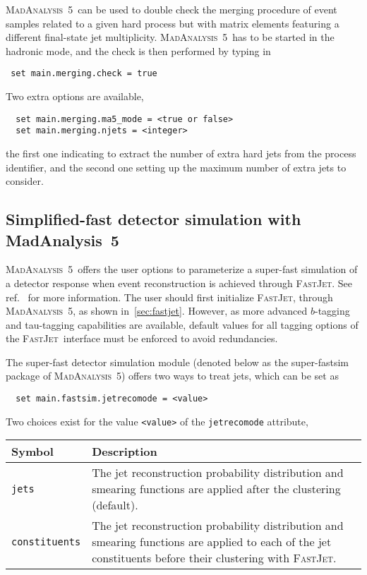\documentclass[a4paper]{article}
\newcommand{\MA}{\textsc{MadAnalysis}~5}
\newcommand{\MAnorm}{{MadAnalysis}~5}
\newcommand{\FJ}{\textsc{FastJet}}
\begin{document}
\noindent \MA\ can be used to double check the merging procedure of event samples related
to a given hard process but with matrix elements featuring a different
final-state jet multiplicity. \MA\ has to be started in the hadronic mode, and
the check is then performed by typing in
{\color{ao}\begin{verbatim}
 set main.merging.check = true
\end{verbatim}}
\noindent Two extra options are available,
{\color{ao}\begin{verbatim}
  set main.merging.ma5_mode = <true or false>
  set main.merging.njets = <integer>
\end{verbatim}}
\noindent the first one indicating to extract the number of extra hard jets from the
process identifier, and the second one setting up the maximum number of extra
jets to consider.

\vspace{.8cm}
\begin{shaded}
	\section{\Large Simplified-fast detector simulation with \MAnorm}
\end{shaded}
\MA\ offers the user options to parameterize a super-fast simulation of a
detector response when event reconstruction is achieved through \FJ. See ref.~\cite{Araz:2020lnp} for more information. The user
should first initialize \FJ, through \MA, as shown in~\autoref{sec:fastjet}.
However, as more advanced $b$-tagging and tau-tagging capabilities are
available, default values for all tagging options of the \FJ\ interface must be
enforced to avoid redundancies.

The super-fast detector simulation module (denoted below as the super-fastsim
package of \MA) offers two ways to treat jets, which can be set as
{\color{ao} \begin{verbatim}
  set main.fastsim.jetrecomode = <value>
\end{verbatim}}
\noindent Two choices exist for the value \verb+<value>+ of the
{\tt jetrecomode} attribute,
\renewcommand{\arraystretch}{1.2}%
\begin{center}
  \begin{tabular}{l p{8.4cm}}
    \hline
    Symbol& Description\\
    \hline
    \color{ao} \verb?jets? &
      The jet reconstruction probability distribution and smearing functions are
      applied after the clustering (default).\\
    \color{ao} \verb?constituents?   &
      The jet reconstruction probability distribution and smearing functions are
      applied to each of the jet constituents before their clustering with \FJ.\\
    \hline
  \end{tabular}
\end{center}
\end{document}
